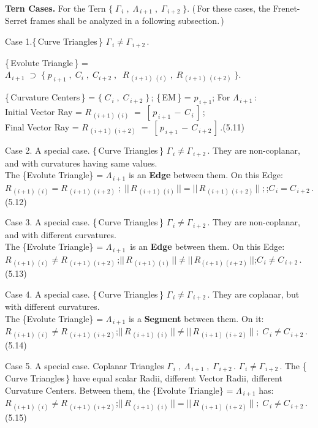 \documentclass[12pt]{article} %
\begin{document}
\noindent  \textbf{Tern Cases.} For the Tern $\big\{\;\Gamma_{\,i}\;,\;\Lambda_{\,i+1}\;,\;\Gamma_{\,i+2}\;\big\}$. \qquad (\,For these cases, the Frenet-Serret frames shall be analyzed in a following subsection.\,) 

\noindent Case 1.\quad\{\,Curve Triangles\,\}  \; $\Gamma_{\,i} \neq \Gamma_{\,i+2}$\,.

\noindent \{\,Evolute Triangle\,\} = $\Lambda_{\,i+1}\;\supset\;\big\{\;p_{\;i+1}\;,\;C_{i}\;,\;C_{i+2}\;,\;\;R_{\,(i+1)\;(i)}\;,\;R_{\,(i+1)\;(i+2)}\;\big\}$.

\noindent \{\,Curvature Centers\,\} = $\{\;C_{\,i}\;,\;C_{\,i+2}\;\}$\,; \{\,EM\,\} = $p_{\,i+1}$\;;\; For $\Lambda_{\,i+1}$\,:\\Initial Vector Ray =  $R_{\,(i+1)\,(i)}\;=\;[\,p_{\,i+1}\,-\,C_{\,i}\,]$\;\,;\\Final Vector Ray = $R_{\,(i+1)\,(i+2)}\;=\;[\,p_{\,i+1}\,-\,C_{\,i+2}\,]$\,.\qquad \qquad (5.11)

\noindent Case 2. A special case. \;\{\,Curve Triangles\,\} \; $\Gamma_{\,i} \neq \Gamma_{\,i+2}$\,. They are non-coplanar, and with curvatures having same values.\\ The \{Evolute Triangle\} = $\Lambda_{\,i+1}$ is an \textbf{Edge} between them. On this Edge: \\$R_{\,(i+1)\,(i)} = R_{\,(i+1)\,(i+2)}\;;\;||\,R_{\,(i+1)\,(i)}\,|| = ||\,R_{\,(i+1)\,(i+2)}\,||\;;$\;;\;$C_{\,i} = C_{\,i+2}$\,. (5.12) 

\noindent Case 3. A special case. \{\,Curve Triangles\,\} \;$\Gamma_{\,i} \neq \Gamma_{\,i+2}$\,. They are non-coplanar, and with different curvatures.\\ The \{Evolute Triangle\} = $\Lambda_{\,i+1}$\, is an \textbf{Edge} between them. On this Edge:\\ $R_{\,(i+1)\,(i)} \neq R_{\,(i+1)\,(i+2)}$\,;\;$||\,R_{\,(i+1)\,(i)}\,|| \neq ||\,R_{(i+1)\,(i+2)}\,||$\;;\;$C_{\,i} \neq C_{\,i+2}$\,.\qquad (5.13)

\noindent Case 4. A special case. \{\,Curve Triangles\,\} $\Gamma_{\,i} \neq \Gamma_{\,i+2}$\,. They are coplanar, but with different curvatures.\\The \{Evolute Triangle\} = $\Lambda_{\,i+1}$ is a \textbf{Segment} between them. On it:\\ $R_{\,(i+1)\,(i)} \neq R_{\,(i+1)\,(i+2)}$\;;\;$||\,R_{\,(i+1)\,(i)}\,|| \neq ||\,R_{\,(i+1)\,(i+2)}\,||\;;\;C_{\,i} \neq C_{\,i+2}$\,.\quad  (5.14) 

\noindent Case 5. A special case. Coplanar Triangles $\Gamma_{\,i}\;,\;\Lambda_{\,i+1}\;,\; \Gamma_{\,i+2}$\,. $\Gamma_{\,i} \neq \Gamma_{\,i+2}$\,. The \{\,Curve Triangles\,\} have equal scalar Radii,  different Vector Radii, different Curvature Centers. Between them, the \{Evolute Triangle\} = $\Lambda_{\,i+1}$ has: \,$R_{\,(i+1)\,(i)} \neq R_{\,(i+1)\,(i+2)}$\;;\;$||\,R_{\,(i+1)\,(i)}\,|| = ||\,R_{\,(i+1)\,(i+2)}\,||\;;\;C_{\,i} \neq C_{\,i+2}$\,.\quad (5.15)  
\end{document}
